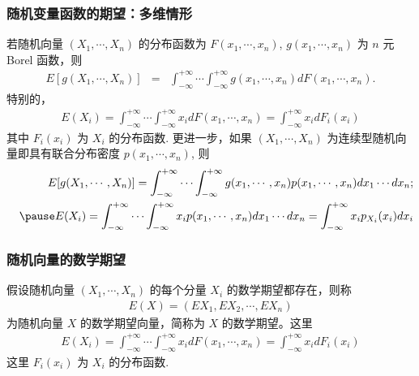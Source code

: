 \documentclass[Prob-All.tex]{subfiles}
\begin{document}
	\begin{frame}
		\frametitle{随机变量函数的期望：多维情形}
		\begin{thm}
			若随机向量 $(X_1,\cdots, X_n)$ 的分布函数为 $F (x_1,\cdots,x_n)$, $g (x_1,\cdots, x_n)$ 为 $n$ 元 Borel 函数，则
			\begin{eqnarray*}
				E[g(X_1,\cdots, X_n)]&=&\int_{-\infty}^{+\infty}\cdots\int_{-\infty}^{+\infty}g(x_1,\cdots,x_n)dF(x_1,\cdots,x_n).
			\end{eqnarray*}
			特别的，\pause
			\begin{eqnarray*}
				E(X_i)=\int_{-\infty}^{+\infty}\cdots\int_{-\infty}^{+\infty}x_idF(x_1,\cdots,x_n)=\int_{-\infty}^{+\infty}x_idF_i(x_i)
			\end{eqnarray*}
			其中 $F_i (x_i)$ 为 $X_i$ 的分布函数. \pause 更进一步，如果 $(X_1,\cdots,X_n)$ 为连续型随机向量即具有联合分布密度 $p (x_1,\cdots,x_n)$, 则 \pause
			\begin{eqnarray*}
				&&E[g(X_1,\cdots, X_n)]=\int_{-\infty}^{+\infty}\cdots\int_{-\infty}^{+\infty}g(x_1,\cdots,x_n)p(x_1,\cdots,x_n)dx_1\cdots dx_n;\\
				&&\pause E(X_i)=\int_{-\infty}^{+\infty}\cdots\int_{-\infty}^{+\infty}x_ip(x_1,\cdots,x_n)dx_1\cdots dx_n=\int_{-\infty}^{+\infty}x_ip_{X_i}(x_i)dx_i
			\end{eqnarray*}
		\end{thm}
	\end{frame}
	\begin{frame}
		\frametitle{随机向量的数学期望}
		\begin{defi}
			假设随机向量 $(X_1,\cdots, X_n)$ 的每个分量 $X_i$ 的数学期望都存在，则称
			\begin{eqnarray*}
				E(X)=(EX_1,EX_2,\cdots,EX_n)
			\end{eqnarray*}
			为随机向量 $X$ 的数学期望向量，简称为 $X$ 的数学期望。这里
			\begin{eqnarray*}
				E(X_i)=\int_{-\infty}^{+\infty}\cdots\int_{-\infty}^{+\infty}x_idF(x_1,\cdots,x_n)=\int_{-\infty}^{+\infty}x_idF_i(x_i)
			\end{eqnarray*}
			这里 $F_i (x_i)$ 为 $X_i$ 的分布函数.

		\end{defi}

	\end{frame}
\end{document}
